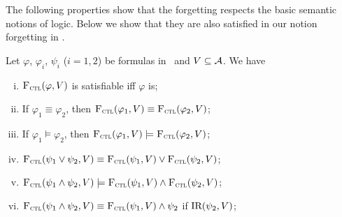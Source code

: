 \documentclass[twoside,11pt]{article}
\begin{document}
The following properties show that the forgetting respects the basic semantic notions of logic. %
Below we show that they are also satisfied in our notion forgetting in \CTL.
\begin{proposition}\label{pro:ctl:forget:1}
	Let $\varphi$, $\varphi_i$, $\psi_i$ ($i=1,2$) be formulas in \CTL\ and $V\subseteq {\cal A}$. We have
	\begin{enumerate}[(i)]
		\item ${\textsc{F}_{\textsc{ctl}}}(\varphi, V)$ is satisfiable iff $\varphi$ is;
		\item If $\varphi_1 \equiv \varphi_2$, then ${\textsc{F}_{\textsc{ctl}}}(\varphi_1, V) \equiv {\textsc{F}_{\textsc{ctl}}}(\varphi_2, V)$;
		\item If $\varphi_1 \models \varphi_2$, then ${\textsc{F}_{\textsc{ctl}}}(\varphi_1, V) \models {\textsc{F}_{\textsc{ctl}}}(\varphi_2, V)$;
		\item ${\textsc{F}_{\textsc{ctl}}}(\psi_1 \vee \psi_2, V) \equiv {\textsc{F}_{\textsc{ctl}}}(\psi_1, V) \vee {\textsc{F}_{\textsc{ctl}}}(\psi_2, V)$;
		\item ${\textsc{F}_{\textsc{ctl}}}(\psi_1 \wedge \psi_2, V) \models {\textsc{F}_{\textsc{ctl}}}(\psi_1, V) \wedge {\textsc{F}_{\textsc{ctl}}}(\psi_2, V)$;
        \item ${\textsc{F}_{\textsc{ctl}}}(\psi_1 \wedge \psi_2, V) \equiv {\textsc{F}_{\textsc{ctl}}}(\psi_1, V) \wedge  \psi_2$ if $\textrm{IR}(\psi_2,V)$;
	\end{enumerate}
\end{proposition}
\end{document}
